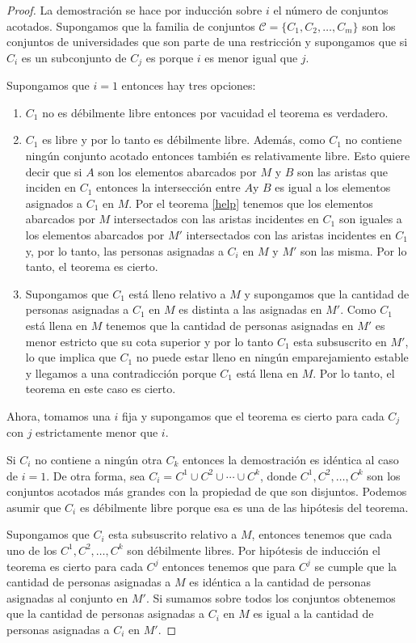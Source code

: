 \begin{proof}
La demostración se hace por inducción sobre $i$ el número de conjuntos acotados. Supongamos que la familia de conjuntos $\mathcal{C}=\{C_1,C_2,\dots,C_m\}$ son los conjuntos de universidades que son parte de una restricción y supongamos que si $C_i$ es un subconjunto de $C_j$ es porque $i$ es menor igual que $j$. 

Supongamos que $i=1$ entonces hay tres opciones:
\begin{enumerate}
\item $C_1$ no es débilmente libre entonces por vacuidad el teorema es verdadero.
\item $C_1$ es libre y por lo tanto es débilmente libre. Además, como $C_1$ no contiene ningún conjunto acotado entonces también es relativamente libre. Esto quiere decir que si $A$ son los elementos abarcados por $M$ y $B$ son las aristas que inciden en $C_1$ entonces la intersección entre $A$y $B$ es igual a los elementos asignados a $C_1$ en $M$. Por el teorema \ref{help} tenemos que los elementos abarcados por $M$ intersectados con las aristas incidentes en $C_1$ son iguales a los elementos abarcados por $M'$ intersectados con las aristas incidentes en $C_1$ y, por lo tanto, las personas asignadas a $C_i$ en $M$ y $M'$ son las misma. Por lo tanto, el teorema es cierto. 
\item Supongamos que $C_1$ está lleno relativo a $M$ y supongamos que la cantidad de personas asignadas a $C_1$ en $M$ es distinta a las asignadas en $M'$. Como $C_1$ está llena en $M$ tenemos que la cantidad de personas asignadas en $M'$ es menor estricto que su cota superior y por lo tanto $C_1$ esta subsuscrito en $M'$, lo que implica que $C_1$ no puede estar lleno en ningún emparejamiento estable y llegamos a una contradicción porque $C_1$ está llena en $M$. Por lo tanto, el teorema en este caso es cierto. 
\end{enumerate}
Ahora, tomamos una $i$ fija y supongamos que el teorema es cierto para cada $C_j$ con $j$ estrictamente menor que $i$. 

Si $C_i$ no contiene a ningún otra $C_k$ entonces la demostración es idéntica al caso de $i=1$. De otra forma, sea $C_i = C^1 \cup C^2 \cup \cdots \cup C^k$, donde $C^1,C^2,\dots,C^k$ son los conjuntos acotados más grandes con la propiedad de que son disjuntos. Podemos asumir que $C_i$ es débilmente libre porque esa es una de las hipótesis del teorema. 

Supongamos que $C_i$ esta subsuscrito relativo a $M$, entonces tenemos que cada uno de los $C^1,C^2,\dots,C^k$ son débilmente libres. Por hipótesis de inducción el teorema es cierto para cada $C^j$ entonces tenemos que para $C^j$ se cumple que la cantidad de personas asignadas a $M$ es idéntica a la cantidad de personas asignadas al conjunto en $M'$. Si sumamos sobre todos los conjuntos obtenemos que la cantidad de personas asignadas a $C_i$ en $M$ es igual a la cantidad de personas asignadas a $C_i$ en $M'$. 


\end{proof}
